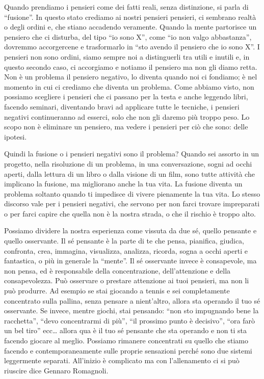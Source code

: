 \documentclass[12pt]{book} %
\begin{document}
Quando prendiamo i pensieri come dei fatti reali, senza distinzione, si parla di “fusione”. In questo stato crediamo ai
nostri pensieri pensieri, ci sembrano realtà o degli ordini e, che stiano accadendo veramente. Quando la mente
partorisce un pensiero che ci disturba, del tipo “io sono X”, come “io non valgo abbastanza”, dovremmo accorgercene e
trasformarlo in “sto avendo il pensiero che io sono X”. I pensieri non sono ordini, siamo sempre noi a distinguerli tra
utili e inutili e, in questo secondo caso, ci accorgiamo e notiamo il pensiero ma non gli diamo retta. Non è un
problema il pensiero negativo, lo diventa quando noi ci fondiamo; è nel momento in cui ci crediamo che diventa un
problema. Come abbiamo visto, non possiamo scegliere i pensieri che ci passano per la testa e anche leggendo libri,
facendo seminari, diventando bravi ad applicare tutte le tecniche, i pensieri negativi continueranno ad esserci, solo
che non gli daremo più troppo peso. Lo scopo non è eliminare un pensiero, ma vedere i pensieri per ciò che sono: delle
ipotesi. 

Quindi la fusione o i pensieri negativi sono il problema? Quando sei assorto in un progetto, nella risoluzione di un
problema, in una conversazione, sogni ad occhi aperti, dalla lettura di un libro o dalla visione di un film, sono tutte
attività che implicano la fusione, ma migliorano anche la tua vita. La fusione diventa un problema soltanto quando ti
impedisce di vivere pienamente la tua vita. Lo stesso discorso vale per i pensieri negativi, che servono per non farci
trovare impreparati o per farci capire che quella non è la nostra strada, o che il rischio è troppo alto. 

Possiamo dividere la nostra esperienza come vissuta da due sé, quello pensante e quello osservante. Il sé pensante è la
parte di te che pensa, pianifica, giudica, confronta, crea, immagina, visualizza, analizza, ricorda, sogna a occhi
aperti e fantastica, o più in generale la “mente”. Il sé osservante invece è consapevole, ma non pensa, ed è
responsabile della concentrazione, dell'attenzione e della consapevolezza. Può osservare o
prestare attenzione ai tuoi pensieri, ma non li può produrre. Ad esempio se stai giocando a tennis e sei completamente
concentrato sulla pallina, senza pensare a nient'altro, allora sta operando il tuo sé osservante.
Se invece, mentre giochi, stai pensando: “non sto impugnando bene la racchetta”, “devo concentrarmi di più”, “il
prossimo punto è decisivo”, “ora farò un bel tiro” ecc… allora qua è il tuo sé pensante che sta operando e non ti sta
facendo giocare al meglio. Possiamo rimanere concentrati su quello che stiamo facendo e contemporaneamente sulle proprie sensazioni perché sono due sistemi leggermente separati. All'inizio è complicato ma con l'allenamento ci si può riuscire dice Gennaro Romagnoli.
\end{document}
